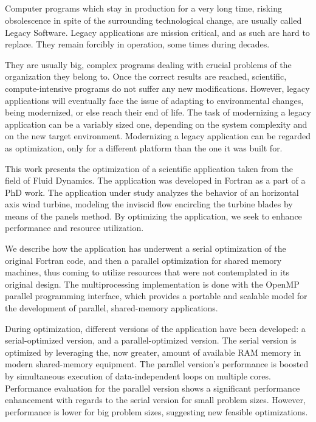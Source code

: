 \ \\
\ \\
\label{pagsumm}
\\
\ \\
Computer programs which stay in production for a very long time, risking obsolescence in spite of the surrounding technological change, are usually called Legacy Software. Legacy applications are mission critical, and as such are hard to replace. They remain forcibly in operation, some times during decades.

They are usually big, complex programs dealing with crucial problems of the organization they belong to. Once the correct results are reached, scientific, compute-intensive programs do not suffer any new modifications. However, legacy applications will eventually face the issue of adapting to environmental changes, being modernized, or else reach their end of life. The task of modernizing a legacy application can be a variably sized one, depending on the system complexity and on the new target environment. Modernizing a legacy application can be regarded as optimization, only for a different platform than the one it was built for.

This work presents the optimization of a scientific application taken from the field of Fluid Dynamics. The application was developed in Fortran as a part of a PhD work. The application under study analyzes the behavior of an horizontal axis wind turbine, modeling the inviscid flow encircling the turbine blades by means of the panels method. By optimizing the application, we seek to enhance performance and resource utilization.

We describe how the application has underwent a serial optimization of the original Fortran code, and then a parallel optimization for shared memory machines, thus coming to utilize resources that were not contemplated in its original design. The multiprocessing implementation is done with the OpenMP parallel programming interface, which provides a portable and scalable model for the development of parallel, shared-memory applications. 

During optimization, different versions of the application have been developed: a serial-optimized version, and a parallel-optimized version. The serial version is optimized by leveraging the, now greater, amount of available RAM memory in modern shared-memory equipment. The parallel version's performance is boosted by simultaneous execution of data-independent loops on multiple cores. Performance evaluation for the parallel version shows a significant performance enhancement with regards to the serial version for small problem sizes. However, performance is lower for big problem sizes, suggesting new feasible optimizations.

\vfill
\pagebreak
